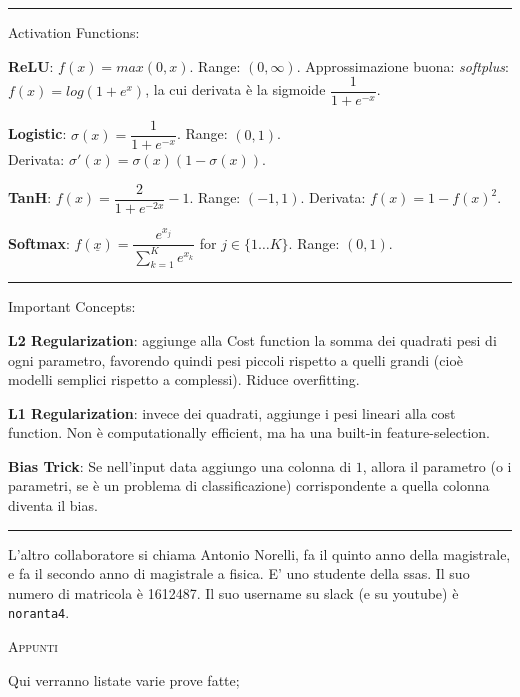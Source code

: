 \documentclass[a4paper,10pt]{article} %
\newcommand{\msection}[1]{%
    {\newpage\bigbreak \bigbreak \par \hfil \huge \textsc {#1}}\par}
\renewcommand{\b}[1]{%
    {\textbf{#1}}}
\renewcommand{\t}[1]{%
    {\texttt{#1}}}
\renewcommand{\v}[1]{%
    {\underline{#1}}}
\begin{document}
\bigbreak
\hrule
\medbreak
\centerline{Activation Functions:}
\begin{multicols}{2} 

\parindent=0pt

\b{ReLU}: $f(x) = max(0, x)$. Range: $( 0, \infty)$. Approssimazione buona: \emph{softplus}: $f(x) = log(1 + e^x)$, la cui derivata è la sigmoide $\dfrac{1}{1 + e^{-x}}$.

\b{Logistic}: $\sigma(x) = \dfrac{1}{1 + e^{-x}}$. Range: $(0, 1)$.\\ Derivata: $\sigma'(x) = \sigma(x)(1 - \sigma(x))$.

\columnbreak

\b{TanH}: $f(x) = \dfrac{2}{1 + e^{-2x}} - 1$. Range: $(-1, 1)$. Derivata: $f(x) = 1 - f(x)^2$.

\b{Softmax}: $f(\v{x}) = \dfrac{e^{x_j}}{\sum^K_{k=1} e^{x_k}}$ for $j \in \{1 \ldots K \}$. Range: $(0, 1)$.

\end{multicols}
\bigbreak
\hrule
\medbreak
\centerline{Important Concepts:}
\begin{multicols}{2} 

\parindent=0pt

\b{L2 Regularization}: aggiunge alla Cost function la somma dei quadrati pesi di ogni parametro, favorendo quindi pesi piccoli rispetto a quelli grandi (cioè modelli semplici rispetto a complessi). Riduce overfitting.

\b{L1 Regularization}: invece dei quadrati, aggiunge i pesi lineari alla cost function. Non è computationally efficient, ma ha una built-in feature-selection.

    \b{Bias Trick}: Se nell'input data aggiungo una colonna di $1$, allora il parametro (o i parametri, se è un problema di classificazione) corrispondente a quella colonna diventa il bias.

\end{multicols}
\medbreak
\hrule
\medbreak
\begin{multicols}{2} 


\end{multicols}

L'altro collaboratore si chiama Antonio Norelli, fa il quinto anno della magistrale, e fa il secondo anno di magistrale a fisica. E' uno studente della ssas. Il suo numero di matricola è 1612487. Il suo username su slack (e su youtube) è \t{noranta4}.

\msection{Appunti}

Qui verranno listate varie prove fatte;
\end{document}
